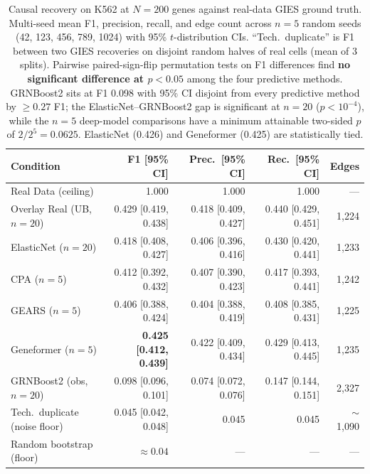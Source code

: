 \documentclass{article}
\theoremstyle{plain}
\theoremstyle{definition}
\theoremstyle{remark}
\begin{document}
\begin{table}[t]
\caption{Causal recovery on K562 at $N{=}200$ genes against real-data GIES ground truth. Multi-seed mean F1, precision, recall, and edge count across $n=5$ random seeds (42, 123, 456, 789, 1024) with 95\% $t$-distribution CIs. ``Tech.\ duplicate'' is F1 between two GIES recoveries on disjoint random halves of real cells (mean of 3 splits). Pairwise paired-sign-flip permutation tests on F1 differences find \textbf{no significant difference at $p<0.05$} among the four predictive methods. GRNBoost2 sits at F1 0.098 with 95\% CI disjoint from every predictive method by $\geq 0.27$ F1; the ElasticNet--GRNBoost2 gap is significant at $n=20$ ($p<10^{-4}$), while the $n=5$ deep-model comparisons have a minimum attainable two-sided $p$ of $2/2^5 = 0.0625$. ElasticNet (0.426) and Geneformer (0.425) are statistically tied.}
\label{tab:main}
\vskip 0.1in
\centering
\small
\setlength{\tabcolsep}{3pt}
\begin{tabular}{lrrrr}
\toprule
\textbf{Condition} & \textbf{F1 [95\% CI]} & \textbf{Prec.\ [95\% CI]} & \textbf{Rec.\ [95\% CI]} & \textbf{Edges} \\
\midrule
Real Data (ceiling)   & 1.000                & 1.000                & 1.000                & --- \\
Overlay Real (UB, $n{=}20$) & 0.429 [0.419, 0.438] & 0.418 [0.409, 0.427] & 0.440 [0.429, 0.451] & 1{,}224 \\
ElasticNet ($n{=}20$) & 0.418 [0.408, 0.427] & 0.406 [0.396, 0.416] & 0.430 [0.420, 0.441] & 1{,}233 \\
CPA ($n{=}5$)         & 0.412 [0.392, 0.432] & 0.407 [0.390, 0.423] & 0.417 [0.393, 0.441] & 1{,}242 \\
GEARS ($n{=}5$)       & 0.406 [0.388, 0.424] & 0.404 [0.388, 0.419] & 0.408 [0.385, 0.431] & 1{,}225 \\
Geneformer ($n{=}5$)  & \textbf{0.425 [0.412, 0.439]} & 0.422 [0.409, 0.434] & 0.429 [0.413, 0.445] & 1{,}235 \\
GRNBoost2 (obs, $n{=}20$) & 0.098 [0.096, 0.101] & 0.074 [0.072, 0.076] & 0.147 [0.144, 0.151] & 2{,}327 \\
\midrule
Tech.\ duplicate (noise floor) & 0.045 [0.042, 0.048] & 0.045 & 0.045 & $\sim$1{,}090 \\
Random bootstrap (floor)       & $\approx 0.04$  & ---             & ---             & --- \\
\bottomrule
\end{tabular}
\vskip -0.1in
\end{table}
\end{document}
